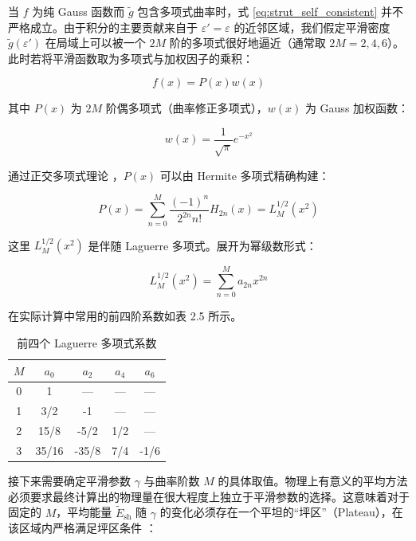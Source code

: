 当 $f$ 为纯 Gauss 函数而 $\tilde{g}$ 包含多项式曲率时，式 \ref{eq:strut_self_consistent}
并不严格成立。由于积分的主要贡献来自于 $\varepsilon'=\varepsilon$ 的近邻区域，我们假定平滑密度 $\tilde{g}(\varepsilon')$
在局域上可以被一个 $2M$ 阶的多项式很好地逼近（通常取 $2M=2,4,6$）。此时若将平滑函数取为多项式与加权因子的乘积：

\begin{equation}
f(x)=P(x)w(x)\label{eq:strut_f_pw}
\end{equation}

其中 $P(x)$ 为 $2M$ 阶偶多项式（曲率修正多项式），$w(x)$ 为 Gauss 加权函数：

\begin{equation}
w(x)=\frac{1}{\sqrt{\pi}}e^{-x^{2}}\label{eq:strut_gauss_w}
\end{equation}

通过正交多项式理论 \cite{AS65}，$P(x)$ 可以由 Hermite 多项式精确构建：

\begin{equation}
P(x)=\sum^{M}_{n=0}\frac{(-1)^{n}}{2^{2n}n!}H_{2n}(x)=L^{1/2}_{M}(x^{2})\label{eq:strut_laguerre}
\end{equation}

这里 $L^{1/2}_{M}(x^{2})$ 是伴随 Laguerre 多项式。展开为幂级数形式：

\begin{equation}
L^{1/2}_{M}(x^{2})=\sum^{M}_{n=0}a_{2n}x^{2n}\label{eq:strut_laguerre_poly}
\end{equation}

在实际计算中常用的前四阶系数如表 2.5 所示。

\begin{table}[htbp]
\caption{\label{tab:laguerre_coefficients}前四个 Laguerre 多项式系数}

\centering{}%
\begin{tabular}{ccccc}
\hline 
$M$ & $a_{0}$ & $a_{2}$ & $a_{4}$ & $a_{6}$\tabularnewline
\hline 
0 & 1 & — & — & —\tabularnewline
1 & 3/2 & -1 & — & —\tabularnewline
2 & 15/8 & -5/2 & 1/2 & —\tabularnewline
3 & 35/16 & -35/8 & 7/4 & -1/6\tabularnewline
\hline 
\end{tabular}
\end{table}

接下来需要确定平滑参数 $\gamma$ 与曲率阶数 $M$ 的具体取值。物理上有意义的平均方法必须要求最终计算出的物理量在很大程度上独立于平滑参数的选择。这意味着对于固定的
$M$，平均能量 $\tilde{E}_{\text{sh}}$ 随 $\gamma$ 的变化必须存在一个平坦的“坪区”（Plateau），在该区域内严格满足坪区条件
\cite{BP73}：


